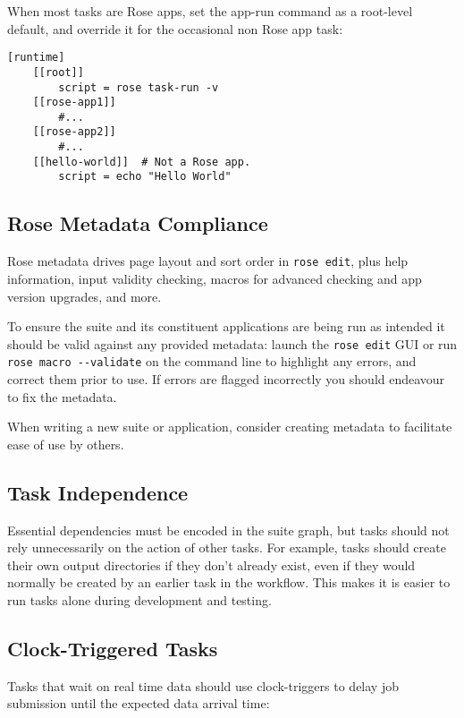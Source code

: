 When most tasks are Rose apps, set the app-run command as a root-level default,
and override it for the occasional non Rose app task:

\lstset{language=suiterc}
\begin{lstlisting}
[runtime]
    [[root]]
        script = rose task-run -v
    [[rose-app1]]
        #...
    [[rose-app2]]
        #...
    [[hello-world]]  # Not a Rose app.
        script = echo "Hello World"
\end{lstlisting}

\subsection{Rose Metadata Compliance}
\label{Rose Metadata Compliance}
 
Rose metadata drives page layout and sort order in \lstinline=rose edit=, plus
help information, input validity checking, macros for advanced checking and app
version upgrades, and more.

To ensure the suite and its constituent applications are being run as intended
it should be valid against any provided metadata: launch the
\lstinline=rose edit= GUI or run \lstinline=rose macro --validate= on the
command line to highlight any errors, and correct them prior to use. If errors
are flagged incorrectly you should endeavour to fix the metadata.

When writing a new suite or application, consider creating metadata to
facilitate ease of use by others.

\subsection{Task Independence}

Essential dependencies must be encoded in the suite graph, but tasks should
not
rely unnecessarily on the action of other tasks. For example, tasks should
create their own output directories if they don't already exist, even if they
would normally be created by an earlier task in the workflow. This makes it is
easier to run tasks alone during development and testing.


\subsection{Clock-Triggered Tasks}
\label{Clock-Triggered Tasks}
Tasks that wait on real time data should use clock-triggers to delay job
submission until the expected data arrival time:

